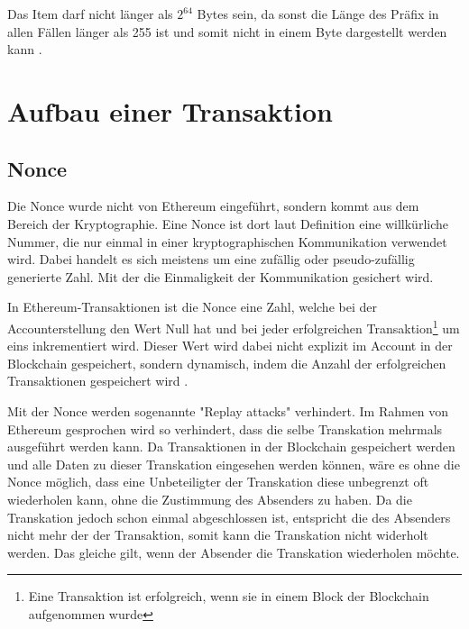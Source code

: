 \documentclass[runningheads]{llncs}
\begin{document}
Das Item darf nicht länger als $2^{64}$ Bytes sein, da sonst die Länge des Präfix in allen Fällen länger als 255 ist und somit nicht in einem Byte dargestellt werden kann \cite[S.18,19]{wood_ethereum/yellowpaper_2019}.
\section{Aufbau einer Transaktion}

\subsection{Nonce}
\label{nonce}
Die Nonce wurde nicht von Ethereum eingeführt, sondern kommt aus dem Bereich der Kryptographie. Eine Nonce ist dort laut Definition %
eine willkürliche Nummer, die nur einmal in einer kryptographischen Kommunikation verwendet wird. Dabei handelt es sich meistens um eine zufällig oder pseudo-zufällig generierte Zahl. Mit der die Einmaligkeit der Kommunikation gesichert wird.

In Ethereum-Transaktionen ist die Nonce eine Zahl, welche bei der Accounterstellung den Wert Null hat und bei jeder erfolgreichen Transaktion\footnote{Eine Transaktion ist erfolgreich, wenn sie in einem Block der Blockchain aufgenommen wurde} um eins inkrementiert wird. Dieser Wert wird dabei nicht explizit im Account in der Blockchain gespeichert, sondern dynamisch, indem die Anzahl der erfolgreichen Transaktionen gespeichert wird \cite[S.101]{antonopoulos_mastering_2019}.

Mit der Nonce werden sogenannte "Replay attacks" verhindert. Im Rahmen von Ethereum gesprochen wird so verhindert, dass die selbe Transkation mehrmals ausgeführt werden kann. Da Transaktionen in der Blockchain gespeichert werden und alle Daten zu dieser Transkation eingesehen werden können, wäre es ohne die Nonce möglich, dass eine Unbeteiligter der Transkation diese unbegrenzt oft wiederholen kann, ohne die Zustimmung des Absenders zu haben. Da die Transkation jedoch schon einmal abgeschlossen ist, entspricht die des Absenders nicht mehr der der Transaktion, somit kann die Transkation nicht widerholt werden.
Das gleiche gilt, wenn der Absender die Transkation wiederholen möchte.
\end{document}
